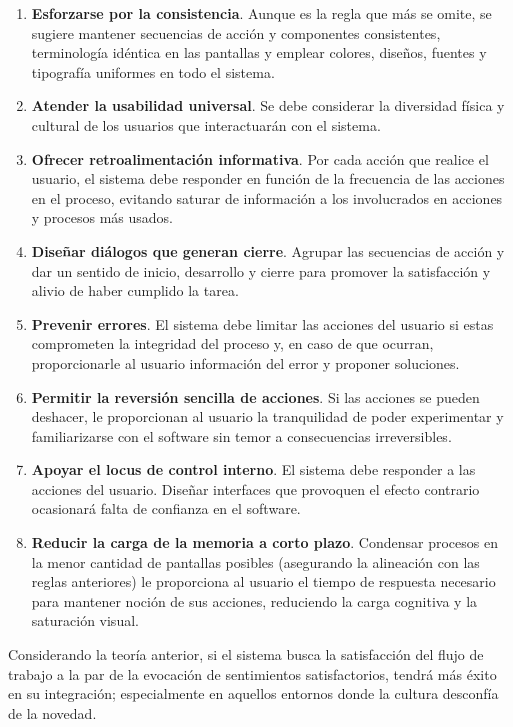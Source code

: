 \begin{enumerate}
    \item \textbf{Esforzarse por la consistencia}. Aunque es la regla que más se omite, se sugiere mantener secuencias de acción y componentes consistentes, terminología idéntica en las pantallas y emplear colores, diseños, fuentes y tipografía uniformes en todo el sistema. 
    \item \textbf{Atender la usabilidad universal}. Se debe considerar la diversidad física y cultural de los usuarios que interactuarán con el sistema.
    \item \textbf{Ofrecer retroalimentación informativa}. Por cada acción que realice el usuario, el sistema debe responder en función de la frecuencia de las acciones en el proceso, evitando saturar de información a los involucrados en acciones y procesos más usados.
    \item \textbf{Diseñar diálogos que generan cierre}. Agrupar las secuencias de acción y dar un sentido de inicio, desarrollo y cierre para promover la satisfacción y alivio de haber cumplido la tarea. 
    \item \textbf{Prevenir errores}. El sistema debe limitar las acciones del usuario si estas comprometen la integridad del proceso y, en caso de que ocurran, proporcionarle al usuario información del error y proponer soluciones. 
    \item \textbf{Permitir la reversión sencilla de acciones}. Si las acciones se pueden deshacer, le proporcionan al usuario la tranquilidad de poder experimentar y familiarizarse con el software sin temor a consecuencias irreversibles.
    \item \textbf{Apoyar el locus de control interno}. El sistema debe responder a las acciones del usuario. Diseñar interfaces que provoquen el efecto contrario ocasionará falta de confianza en el software.
    \item \textbf{Reducir la carga de la memoria a corto plazo}. Condensar procesos en la menor cantidad de pantallas posibles (asegurando la alineación con las reglas anteriores) le proporciona al usuario el tiempo de respuesta necesario para mantener noción de sus acciones, reduciendo la carga cognitiva y la saturación visual. 
\end{enumerate}

Considerando la teoría anterior, si el sistema busca la satisfacción del flujo de trabajo a la par de la evocación de sentimientos satisfactorios, tendrá más éxito en su integración; especialmente en aquellos entornos donde la cultura desconfía de la novedad. 

